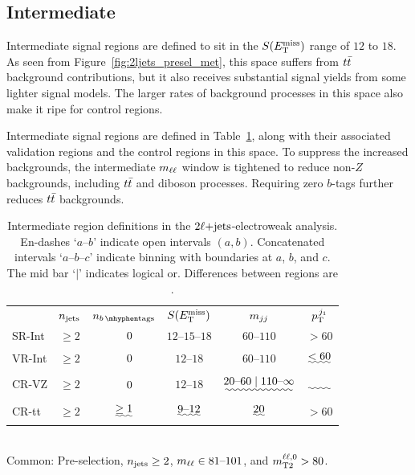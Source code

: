 \FloatBarrier
\subsection{Intermediate}
\label{sec:2ljets_int}

Intermediate signal regions are defined to sit in the $S(E_\mathrm{T}^\mathrm{miss})$ range of
$12$ to $18$.
As seen from Figure~\ref{fig:2ljets_presel_met}, this space suffers from
$t\bar t$ background contributions, but it also receives substantial signal
yields from some lighter signal models.
The larger rates of background processes in this space also make it ripe for
control regions.

Intermediate signal regions are defined in Table~\ref{tab:2ljets_int},
along with their associated validation regions and the control regions in this
space.
To suppress the increased backgrounds, the intermediate $m_{\ell\ell}$ window is
tightened to reduce non-$Z$ backgrounds, including $t\bar t$ and diboson
processes.
Requiring zero $b$-tags further reduces $t\bar t$ backgrounds.

\begin{table}[tp]
\centering
\begin{tabular}{lccccc}
& $n_\mathrm{jets}$
& $\nbtag$
& $S(E_\mathrm{T}^\mathrm{miss})$
& $m_{jj}$
& $p_\mathrm{T}^{\,j_1}$
\\[1em]
SR-Int
& $\geq 2$
& $\hphantom{\geq}~0$
& $12\textrm{--}15\textrm{--}18$
& $60\textrm{--}110$
& $> 60$
\\[0.5em]
\: VR-Int
& $\geq 2$
& $\hphantom{\geq}~0$
& $12\textrm{--}18$
& $60\textrm{--}110$
& $\uwave{< 60}$
\\[1em]
CR-VZ
& $\geq 2$
& $\hphantom{\geq}~0$
& $12\textrm{--}18$
& $\uwave{20\textrm{--}60 \mid 110\textrm{--}\infty}$
& $\uwave{\hphantom{< 60}}$
\\[0.5em]
CR-tt
& $\geq 2$
& $\uwave{\geq 1}$
& $\uwave{9\textrm{--}12}$
& $\uwave{20}$
& $> 60$
\end{tabular}
\\[1em]
Common: Pre-selection,
$n_\mathrm{jets} \geq 2$,
$m_{\ell\ell} \in 81\textrm{--}101$, and
$m_\mathrm{T2}^{\ell\ell,0} > 80$.
\caption[
Intermediate region definitions in the $\twoljets$-electroweak analysis
]{%
Intermediate region definitions in the $\twoljets$-electroweak analysis.
En-dashes `$a\textrm{--}b$' indicate open intervals $(a, b)$.
Concatenated intervals `$a\textrm{--}b\textrm{--}c$' indicate binning
with boundaries at $a$, $b$, and $c$.
The mid bar `$\mid$' indicates logical or.
Differences between regions are .
}
\label{tab:2ljets_int}
\end{table}


